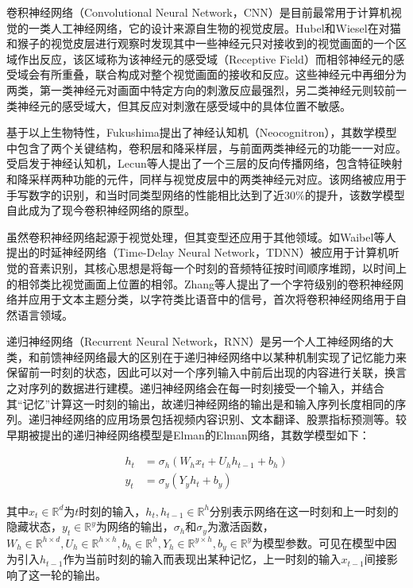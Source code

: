 卷积神经网络（Convolutional Neural Network，CNN）是目前最常用于计算机视觉的一类人工神经网络，它的设计来源自生物的视觉皮层。Hubel和Wiesel\cite{hubel1959receptive}\cite{hubel1968receptive}在对猫和猴子的视觉皮层进行观察时发现其中一些神经元只对接收到的视觉画面的一个区域作出反应，该区域称为该神经元的感受域（Receptive Field）而相邻神经元的感受域会有所重叠，联合构成对整个视觉画面的接收和反应。这些神经元中再细分为两类，第一类神经元对画面中特定方向的刺激反应最强烈，另二类神经元则较前一类神经元的感受域大，但其反应对刺激在感受域中的具体位置不敏感。

基于以上生物特性，Fukushima\cite{fukushima1980neocognitron}提出了神经认知机（Neocognitron），其数学模型中包含了两个关键结构，卷积层和降采样层，与前面两类神经元的功能一一对应。受启发于神经认知机，Lecun等人\cite{lecun1989backpropagation}提出了一个三层的反向传播网络，包含特征映射和降采样两种功能的元件，同样与视觉皮层中的两类神经元对应。该网络被应用于手写数字的识别，和当时同类型网络的性能相比达到了近30\%的提升，该数学模型自此成为了现今卷积神经网络的原型。

虽然卷积神经网络起源于视觉处理，但其变型还应用于其他领域。如Waibel等人\cite{waibel1995phoneme}提出的时延神经网络（Time-Delay Neural Network，TDNN）被应用于计算机听觉的音素识别，其核心思想是将每一个时刻的音频特征按时间顺序堆䟙，以时间上的相邻类比视觉画面上位置的相邻。Zhang等人\cite{zhang2015character}提出了一个字符级别的卷积神经网络并应用于文本主题分类，以字符类比语音中的信号，首次将卷积神经网络用于自然语言领域。

递归神经网络（Recurrent Neural Network，RNN）是另一个人工神经网络的大类，和前馈神经网络最大的区别在于递归神经网络中以某种机制实现了记忆能力来保留前一时刻的状态，因此可以对一个序列输入中前后出现的内容进行关联，换言之对序列的数据进行建模。递归神经网络会在每一时刻接受一个输入，并结合其“记忆”计算这一时刻的输出，故递归神经网络的输出是和输入序列长度相同的序列。递归神经网络的应用场景包括视频内容识别、文本翻译、股票指标预测等。较早期被提出的递归神经网络模型是Elman\cite{elman1990finding}的Elman网络，其数学模型如下：

\begin{align}
  \label{eq:elman_rnn}
  h_t &= \sigma_h (W_h x_t + U_h h_{t-1} + b_h) \\
  y_t &= \sigma_y (Y_y h_t + b_y)
\end{align}

其中$x_t \in \mathbb{R}^d $为$t$时刻的输入，$h_t, h_{t-1} \in \mathbb{R}^h $分别表示网络在这一时刻和上一时刻的隐藏状态，$y_t \in \mathbb{R}^y$为网络的输出，$\sigma_h$和$\sigma_y$为激活函数，$W_h \in \mathbb{R}^{h \times d}, U_h \in \mathbb{R} ^ {h \times h}, b_h \in \mathbb{R}^h, Y_h \in \mathbb{R}^{y \times h}, b_y \in \mathbb{R}^y$为模型参数。可见在模型中因为引入$h_{t-1}$作为当前时刻的输入而表现出某种记忆，上一时刻的输入$x_{t-1}$间接影响了这一轮的输出。

